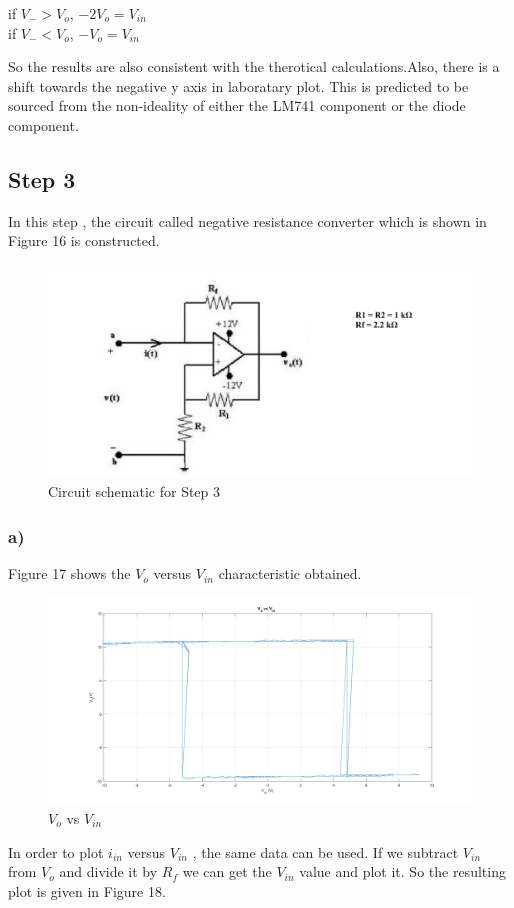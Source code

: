 \documentclass[letterpaper,12pt]{article}
\begin{document}
\begin{center}
if \(V_- > V_o\),  \(-2V_o = V_{in}\) \\
	if \(V_- < V_o\),  \(-V_o = V_{in}\)
\\
\end{center}
So the results are also consistent with the therotical calculations.Also, there is a shift towards the negative y axis in laboratary plot. This is predicted to be sourced from the non-ideality of either the LM741 component or the diode component.
\subsection{Step 3}
In this step , the circuit called negative resistance converter which is shown in Figure 16 is constructed.  
\begin{figure}[H]
	\centering
   \includegraphics[width=1\textwidth]{circuit_5.png}
   \caption{Circuit schematic for Step 3}
\end{figure}

\subsubsection{a)}
Figure 17 shows the \(V_{o}\) versus \(V_{in}\) characteristic obtained. 
\begin{figure}[H]
	\centering
   \includegraphics[width=1\textwidth]{3a_1.png}
   \caption{\(V_{o}\) vs \(V_{in}\)}
\end{figure}
In order to plot \(i_{in}\) versus \(V_{in}\) , the same data can be used. If we subtract \(V_{in}\) from \(V_o\) and divide it by \(R_f\) we can get the \(V_{in}\) value and plot it. So the resulting plot is given in Figure 18.
\end{document}
